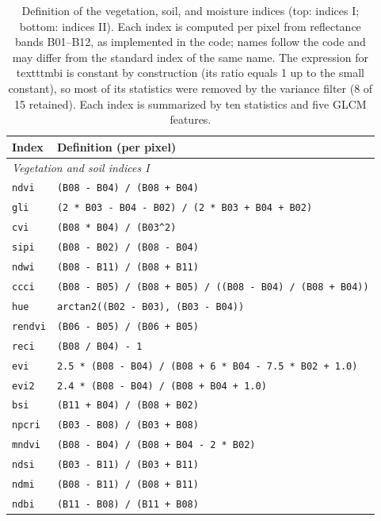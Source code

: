 \documentclass[draft,ea]{agutexSI2019}
\begin{document}
\begin{table}
\caption{Definition of the vegetation, soil, and moisture indices (top: indices I; bottom: indices II). Each index is computed per pixel from reflectance bands B01--B12, as implemented in the code; names follow the code and may differ from the standard index of the same name. The expression for \\texttt{mbi} is constant by construction (its ratio equals 1 up to the small constant), so most of its statistics were removed by the variance filter (8 of 15 retained). Each index is summarized by ten statistics and five GLCM features.}
\centering
\scriptsize\baselineskip=9pt\normalbaselineskip=9pt
\begin{tabular}{l p{}}
\hline
Index & Definition (per pixel) \\
\hline
\multicolumn{2}{l}{\textit{Vegetation and soil indices I}} \\
\texttt{ndvi} & \texttt{(B08 - B04) / (B08 + B04)} \\
\texttt{gli} & \texttt{(2 * B03 - B04 - B02) / (2 * B03 + B04 + B02)} \\
\texttt{cvi} & \texttt{(B08 * B04) / (B03\^{}2)} \\
\texttt{sipi} & \texttt{(B08 - B02) / (B08 - B04)} \\
\texttt{ndwi} & \texttt{(B08 - B11) / (B08 + B11)} \\
\texttt{ccci} & \texttt{(B08 - B05) / (B08 + B05) / ((B08 - B04) / (B08 + B04))} \\
\texttt{hue} & \texttt{arctan2((B02 - B03), (B03 - B04))} \\
\texttt{rendvi} & \texttt{(B06 - B05) / (B06 + B05)} \\
\texttt{reci} & \texttt{(B08 / B04) - 1} \\
\texttt{evi} & \texttt{2.5 * (B08 - B04) / (B08 + 6 * B04 - 7.5 * B02 + 1.0)} \\
\texttt{evi2} & \texttt{2.4 * (B08 - B04) / (B08 + B04 + 1.0)} \\
\texttt{bsi} & \texttt{(B11 + B04) / (B08 + B02)} \\
\texttt{npcri} & \texttt{(B03 - B08) / (B03 + B08)} \\
\texttt{mndvi} & \texttt{(B08 - B04) / (B08 + B04 - 2 * B02)} \\
\texttt{ndsi} & \texttt{(B03 - B11) / (B03 + B11)} \\
\texttt{ndmi} & \texttt{(B08 - B11) / (B08 + B11)} \\
\texttt{ndbi} & \texttt{(B11 - B08) / (B11 + B08)} \\

\end{tabular}
\end{table}
\end{document}
